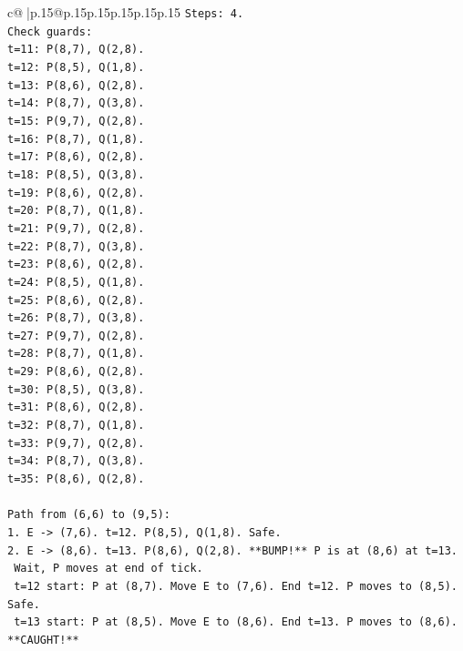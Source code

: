 \documentclass{article}
\begin{document}
{\begin{supertabular}{c@{$\;$}|p{.15\linewidth}@{}p{.15\linewidth}p{.15\linewidth}p{.15\linewidth}p{.15\linewidth}p{.15\linewidth}}
{{{\texttt{Steps: 4.} \\
\texttt{Check guards:} \\
\texttt{t=11: P(8,7), Q(2,8).} \\
\texttt{t=12: P(8,5), Q(1,8).} \\
\texttt{t=13: P(8,6), Q(2,8).} \\
\texttt{t=14: P(8,7), Q(3,8).} \\
\texttt{t=15: P(9,7), Q(2,8).} \\
\texttt{t=16: P(8,7), Q(1,8).} \\
\texttt{t=17: P(8,6), Q(2,8).} \\
\texttt{t=18: P(8,5), Q(3,8).} \\
\texttt{t=19: P(8,6), Q(2,8).} \\
\texttt{t=20: P(8,7), Q(1,8).} \\
\texttt{t=21: P(9,7), Q(2,8).} \\
\texttt{t=22: P(8,7), Q(3,8).} \\
\texttt{t=23: P(8,6), Q(2,8).} \\
\texttt{t=24: P(8,5), Q(1,8).} \\
\texttt{t=25: P(8,6), Q(2,8).} \\
\texttt{t=26: P(8,7), Q(3,8).} \\
\texttt{t=27: P(9,7), Q(2,8).} \\
\texttt{t=28: P(8,7), Q(1,8).} \\
\texttt{t=29: P(8,6), Q(2,8).} \\
\texttt{t=30: P(8,5), Q(3,8).} \\
\texttt{t=31: P(8,6), Q(2,8).} \\
\texttt{t=32: P(8,7), Q(1,8).} \\
\texttt{t=33: P(9,7), Q(2,8).} \\
\texttt{t=34: P(8,7), Q(3,8).} \\
\texttt{t=35: P(8,6), Q(2,8).} \\
\\ 
\texttt{Path from (6,6) to (9,5):} \\
\texttt{1. E {-}> (7,6). t=12. P(8,5), Q(1,8). Safe.} \\
\texttt{2. E {-}> (8,6). t=13. P(8,6), Q(2,8). **BUMP!** P is at (8,6) at t=13.} \\
\texttt{   Wait, P moves at end of tick.} \\
\texttt{   t=12 start: P at (8,7). Move E to (7,6). End t=12. P moves to (8,5). Safe.} \\
\texttt{   t=13 start: P at (8,5). Move E to (8,6). End t=13. P moves to (8,6). **CAUGHT!**} \\
}}}
\end{supertabular}}
\end{document}
